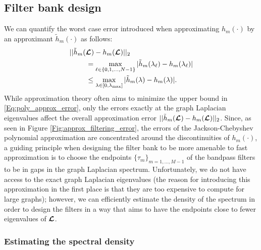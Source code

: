 \documentclass[journal, 10pt]{IEEEtran}
\begin{document}

\subsection{Filter bank design}

We can quantify the worst case error introduced when approximating  $h_m(\cdot)$ by an approximant $\tilde{h}_m(\cdot)$ as follows:
\begin{align} \label{Eq:poly_approx_error}
&||\tilde{h}_m(\L)-h_m(\L) ||_2  \nonumber \\ &~~~~~~~= \max_{\l \in \{0,1,\ldots,N-1\}}|\tilde{h}_m(\lambda_{\l})-h_m(\lambda_{\l}) |  \nonumber \\
 &~~~~~~~\leq \max_{\lambda \in [0,\lambda_{\max}]}|\tilde{h}_m(\lambda)-h_m(\lambda) |.
\end{align}
While approximation theory often aims to minimize the upper bound in \eqref{Eq:poly_approx_error}, only the errors exactly at the graph Laplacian eigenvalues affect the overall approximation error $||\tilde{h}_m(\boldsymbol{\mathcal{L}})-h_m(\boldsymbol{\mathcal{L}}) ||_2$. Since, as seen in Figure \ref{Fig:approx_filtering_error}, the errors of the Jackson-Chebyshev polynomial approximation are concentrated around the discontinuities of $h_m(\cdot)$, a guiding principle when designing the filter bank to be more amenable to fast approximation is to choose the endpoints $\{\tau_m\}_{m=1,\ldots,M-1}$ of the bandpass filters to be in gaps in the graph Laplacian spectrum. Unfortunately, we do not have access to the exact graph Laplacian eigenvalues (the reason for introducing this approximation in the first place is that they are too expensive to compute for large graphs); however, we can efficiently estimate the density of the spectrum in order to design the filters in a way that aims to have the endpoints close to fewer eigenvalues of $\boldsymbol{\mathcal{L}}$.

\subsubsection{Estimating the spectral density} \label{Se:spectral_density}
\end{document}
